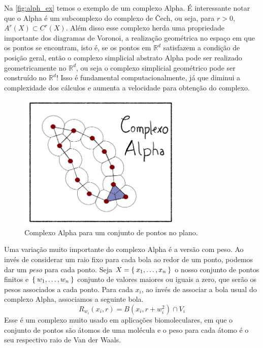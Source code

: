 Na \autoref{fig:alph_ex} temos o exemplo de um complexo Alpha. É interessante
notar que o Alpha é um subcomplexo do complexo de \v{C}ech, ou seja,
para $r > 0$, $A^r(X) \subset C^r(X)$. Além disso esse complexo herda uma propriedade
importante dos diagramas de Voronoi, a realização geométrica no espaço em que os pontos
se encontram, isto é, se os pontos em $\mathbb{R}^d$ satisfazem a condição de
posição geral, então o complexo simplicial abstrato Alpha pode ser
realizado geometricamente no $\mathbb{R}^d$, ou seja o complexo simplicial geométrico
pode ser construído no $\mathbb{R}^d$! Isso é fundamental computacionalmente, já que diminui
a complexidade dos cálculos e aumenta a velocidade para obtenção do complexo.

\begin{figure}[!htpb]
  \centering
  \includegraphics[width=0.7\textwidth]{images/ComplexAlpha.png}
  \caption{Complexo Alpha para um conjunto de pontos no plano.}
  \label{fig:alph_ex}
  \fautor
\end{figure}

Uma variação muito importante do complexo Alpha é a versão com peso. Ao invés
de considerar um raio fixo para cada bola ao redor de um ponto, podemos dar
um \textit{peso} para cada ponto. Seja $X=\Set{x_1, \dots, x_n}$ o nosso
conjunto de pontos finitos e $\Set{w_1, \dots, w_n}$ conjunto de valores
maiores ou iguais a zero, que serão os pesos associados a cada ponto. Para
cada $x_i$, ao invés de associar a bola usual do complexo Alpha, associamos
a seguinte bola.
\begin{equation*}
  R_{w_i}(x_i, r) = B(x_i, r + w_i^2) \cap V_i
\end{equation*}
Esse é um complexo muito usado em aplicações biomoleculares, em que o conjunto de pontos
são átomos de uma molécula e o peso para cada átomo é o seu respectivo raio de
Van der Waals.

